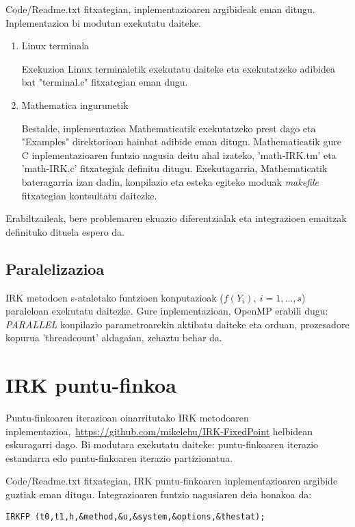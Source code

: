 Code/Readme.txt fitxategian, inplementazioaren argibideak eman ditugu. Inplementazioa bi modutan exekutatu daiteke.

\begin{enumerate}
\item Linux terminala

Exekuzioa Linux terminaletik exekutatu daiteke eta exekutatzeko adibidea bat  "terminal.c" fitxategian eman dugu. 

\item Mathematica ingurunetik

Bestalde, inplementazioa Mathematicatik exekutatzeko prest dago eta "Examples" direktorioan hainbat adibide eman ditugu. Mathematicatik gure C inplementazioaren funtzio nagusia deitu ahal izateko, 'math-IRK.tm' eta 'math-IRK.c' fitxategiak definitu ditugu. Exekutagarria, Mathematicatik bateragarria izan dadin, konpilazio eta esteka egiteko moduak \emph{makefile} fitxategian kontsultatu daitezke.    

\end{enumerate}

Erabiltzaileak, bere problemaren ekuazio diferentzialak eta integrazioen emaitzak definituko dituela espero da. 

\subsection*{Paralelizazioa}

IRK metodoen s-ataletako funtzioen konputazioak ($f(Y_i), \ i=1,\dots,s$) paraleloan exekutatu daitezke. Gure inplementazioan, OpenMP erabili dugu:  \emph{PARALLEL} konpilazio parametroarekin aktibatu daiteke eta orduan, prozesadore kopurua 'threadcount' aldagaian, zehaztu behar da. 


\section{IRK puntu-finkoa}

Puntu-finkoaren iterazioan oinarritutako IRK metodoaren inplementazioa,~\url{https://github.com/mikelehu/IRK-FixedPoint} helbidean eskuragarri dago. Bi modutara exekutatu daiteke: puntu-finkoaren iterazio estandarra edo puntu-finkoaren iterazio partizionatua. 

Code/Readme.txt fitxategian, IRK puntu-finkoaren inplementazioaren argibide guztiak eman ditugu. Integrazioaren funtzio nagusiaren deia honakoa da:   
\begin{lstlisting}
IRKFP (t0,t1,h,&method,&u,&system,&options,&thestat);
\end{lstlisting}

